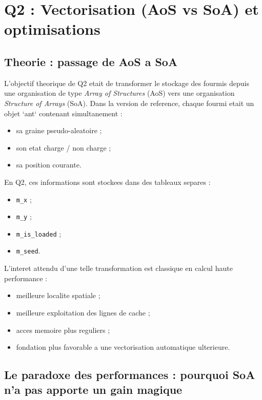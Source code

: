 \documentclass[11pt,a4paper]{article}
\begin{document}
\section{Q2 : Vectorisation (AoS vs SoA) et optimisations}

\subsection{Theorie : passage de AoS a SoA}

L'objectif theorique de Q2 etait de transformer le stockage des fourmis depuis une organisation de type \emph{Array of Structures} (AoS) vers une organisation \emph{Structure of Arrays} (SoA). Dans la version de reference, chaque fourmi etait un objet `ant` contenant simultanement :

\begin{itemize}[leftmargin=1.2em]
  \item sa graine pseudo-aleatoire ;
  \item son etat charge / non charge ;
  \item sa position courante.
\end{itemize}

En Q2, ces informations sont stockees dans des tableaux separes :

\begin{itemize}[leftmargin=1.2em]
  \item \texttt{m\_x} ;
  \item \texttt{m\_y} ;
  \item \texttt{m\_is\_loaded} ;
  \item \texttt{m\_seed}.
\end{itemize}

L'interet attendu d'une telle transformation est classique en calcul haute performance :

\begin{itemize}[leftmargin=1.2em]
  \item meilleure localite spatiale ;
  \item meilleure exploitation des lignes de cache ;
  \item acces memoire plus reguliers ;
  \item fondation plus favorable a une vectorisation automatique ulterieure.
\end{itemize}

\subsection{Le paradoxe des performances : pourquoi SoA n'a pas apporte un gain magique}
\end{document}
